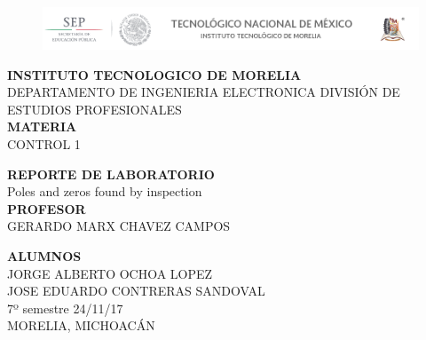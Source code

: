 \documentclass[letterpaper,10pt]{article}
\begin{document}
	
\begin{titlepage}
	\begin{figure}[h!]
		\begin{center}
			\vspace{1.5cm}
			\includegraphics[scale= .5, ]{encabezado.png}
			\label{escudouam1}
			\vspace{-1cm}
		\end{center}
	\end{figure}
	\begin{center}
		\vspace{1cm} 
		\LARGE{\textbf{INSTITUTO TECNOLOGICO DE MORELIA}} \\
		\vspace{1cm}
		DEPARTAMENTO DE INGENIERIA ELECTRONICA
		DIVISIÓN DE ESTUDIOS PROFESIONALES \\  
		\vspace{2.3cm} {\large \textbf{MATERIA}\\ \LARGE CONTROL 1}
		
		
		\vspace{1.5cm} {\large \textbf{REPORTE DE LABORATORIO}\\ \LARGE Poles and zeros found by inspection}\\ 
		
		\vspace{1.5cm} {\large \textbf{PROFESOR}\\ \LARGE GERARDO MARX CHAVEZ CAMPOS}
		
		\vspace{1.5cm} {\large \textbf{ALUMNOS}\\ \large JORGE ALBERTO OCHOA LOPEZ\\JOSE EDUARDO CONTRERAS SANDOVAL} \\
		\normalsize{7º semestre
			\hfill {24/11/17}}\\ 
		MORELIA, MICHOACÁN
	\end{center}
\end{titlepage}
\pagebreak
\justify
\tableofcontents
\pagebreak
{}
	
\end{document}
